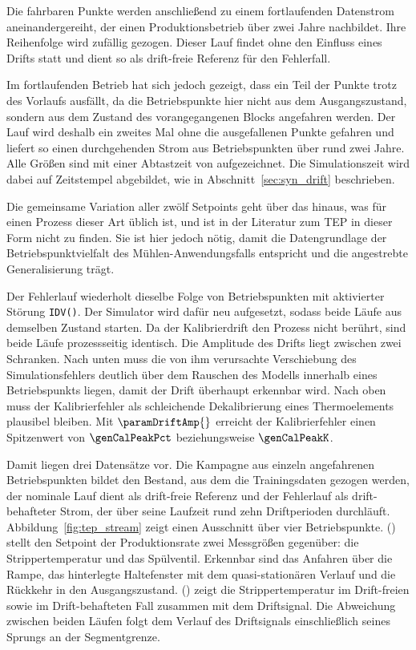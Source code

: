 Die fahrbaren Punkte werden anschließend zu einem fortlaufenden Datenstrom aneinandergereiht, der einen Produktionsbetrieb über zwei Jahre nachbildet. Ihre Reihenfolge wird zufällig gezogen. Dieser Lauf findet ohne den Einfluss eines Drifts statt und dient so als drift-freie Referenz für den Fehlerfall. \par
%
Im fortlaufenden Betrieb hat sich jedoch gezeigt, dass ein Teil der Punkte trotz des Vorlaufs ausfällt, da die Betriebspunkte hier nicht aus dem Ausgangszustand, sondern aus dem Zustand des vorangegangenen Blocks angefahren werden. Der Lauf wird deshalb ein zweites Mal ohne die ausgefallenen Punkte gefahren und liefert so einen durchgehenden Strom aus \genRunPoints{} Betriebspunkten über rund zwei Jahre. Alle Größen sind mit einer Abtastzeit von \genSampleMin{} aufgezeichnet. Die Simulationszeit wird dabei auf Zeitstempel abgebildet, wie in Abschnitt~\ref{sec:syn_drift} beschrieben. \par
%
Die gemeinsame Variation aller zwölf Setpoints geht über das hinaus, was für einen Prozess dieser Art üblich ist, und ist in der Literatur zum \ac{TEP} in dieser Form nicht zu finden. Sie ist hier jedoch nötig, damit die Datengrundlage der Betriebspunktvielfalt des Mühlen-Anwendungsfalls entspricht und die angestrebte Generalisierung trägt. \par
%
Der Fehlerlauf wiederholt dieselbe Folge von Betriebspunkten mit aktivierter Störung \texttt{IDV(\paramDriftIDV)}. Der Simulator wird dafür neu aufgesetzt, sodass beide Läufe aus demselben Zustand starten. Da der Kalibrierdrift den Prozess nicht berührt, sind beide Läufe prozessseitig identisch.
Die Amplitude des Drifts liegt zwischen zwei Schranken. Nach unten muss die von ihm verursachte Verschiebung des Simulationsfehlers deutlich über dem Rauschen des Modells innerhalb eines Betriebspunkts liegen, damit der Drift überhaupt erkennbar wird. Nach oben muss der Kalibrierfehler als schleichende Dekalibrierung eines Thermoelements plausibel bleiben. Mit $\paramDriftAmp{}$ erreicht der Kalibrierfehler einen Spitzenwert von $\genCalPeakPct$ beziehungsweise $\genCalPeakK$. \par
%
Damit liegen drei Datensätze vor. Die Kampagne aus einzeln angefahrenen Betriebspunkten bildet den Bestand, aus dem die Trainingsdaten gezogen werden, der nominale Lauf dient als drift-freie Referenz und der Fehlerlauf als drift-behafteter Strom, der über seine Laufzeit rund zehn Driftperioden durchläuft.
Abbildung~\ref{fig:tep_stream} zeigt einen Ausschnitt über vier Betriebspunkte. () stellt den Setpoint der Produktionsrate zwei Messgrößen gegenüber: die Strippertemperatur und das Spülventil. Erkennbar sind das Anfahren über die Rampe, das hinterlegte Haltefenster mit dem quasi-stationären Verlauf und die Rückkehr in den Ausgangszustand. () zeigt die Strippertemperatur im Drift-freien sowie im Drift-behafteten Fall zusammen mit dem Driftsignal. Die Abweichung zwischen beiden Läufen folgt dem Verlauf des Driftsignals einschließlich seines Sprungs an der Segmentgrenze. \par
